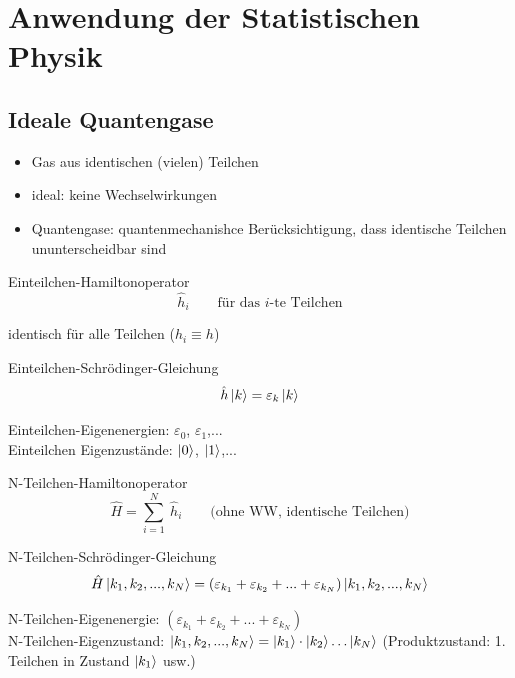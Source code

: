 \section{Anwendung der Statistischen Physik}

\subsection{Ideale Quantengase}
\begin{itemize}
    \item Gas aus identischen (vielen) Teilchen
    \item ideal: keine Wechselwirkungen
    \item Quantengase: quantenmechanishce Berücksichtigung, dass identische Teilchen ununterscheidbar sind
\end{itemize}

\begin{definition}{Einteilchen-Hamiltonoperator}
\begin{equation}
    \hat{h}_i \qquad \text{für das $i$-te Teilchen}
\end{equation}
\end{definition}
identisch für alle Teilchen ($h_i \equiv h$)

\begin{definition}{Einteilchen-Schrödinger-Gleichung}
    \begin{equation}
        \hat{h} \ket{k} = \varepsilon_k \ket{k}
    \end{equation}
\end{definition}
Einteilchen-Eigenenergien: $\varepsilon_0$, $\varepsilon_1$,... \\
Einteilchen Eigenzustände: $\ket{0}$, $\ket{1}$,...

\begin{definition}{N-Teilchen-Hamiltonoperator}
    \begin{equation}
        \hat{H} = \sum_{i=1}^N \ \hat{h}_i \qquad \text{(ohne WW, identische Teilchen)}
    \end{equation}
\end{definition}

\begin{definition}{N-Teilchen-Schrödinger-Gleichung}
    \begin{equation}
        \hat{H} \ket{k_1,k_2,...,k_N} = (\varepsilon_{k_1} + \varepsilon_{k_2} + ... + \varepsilon_{k_N}) \ket{k_1,k_2,...,k_N}
    \end{equation}
\end{definition}
N-Teilchen-Eigenenergie: $(\varepsilon_{k_1} + \varepsilon_{k_2} + ... + \varepsilon_{k_N})$\\
N-Teilchen-Eigenzustand: $\ket{k_1,k_2,...,k_N} = \ket{k_1}\cdot \ket{k_2} \dots \ket{k_N}$ (Produktzustand: 1. Teilchen in Zustand $\ket{k_1}$ usw.)


